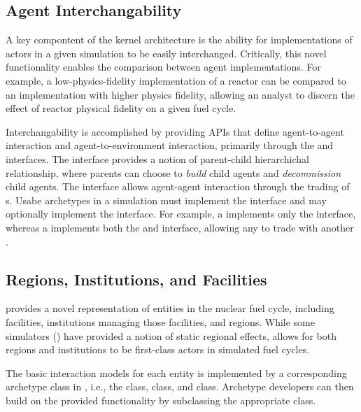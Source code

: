 \subsection{Agent Interchangability}\label{sec:interchangeability}

A key compontent of the \Cyclus kernel architecture is the ability for
implementations of actors in a given simulation to be easily
interchanged. Critically, this novel functionality enables the comparison
between agent implementations. For example, a low-physics-fidelity
implementation of a reactor can be compared to an implementation with higher
physics fidelity, allowing an analyst to discern the effect of reactor physical
fidelity on a given fuel cycle. 

Interchangability is accomplished by providing APIs that define agent-to-agent
interaction and agent-to-environment interaction, primarily through the
 and  interfaces. The  interface
provides a notion of parent-child hierarchichal relationship, where parents can
choose to \textit{build} child agents and \textit{decommission} child
agents. The  interface allows agent-agent interaction through the
trading of s. Usabe archetypes in a \Cyclus simulation must
implement the  interface and may optionally implement the
 interface. For example, a  implements only the
 interface, whereas a  implements both the
 and  interface, allowing any  to
trade with another .

\subsection{Regions, Institutions, and Facilities}

\Cyclus provides a novel representation of entities in the nuclear fuel cycle,
including facilities, institutions managing those facilities, and regions. While
some simulators () have provided a notion of static regional
effects, \Cyclus allows for both regions and institutions to be first-class
actors in simulated fuel cycles.

The basic interaction models for each entity is implemented by a corresponding
archetype class in \Cyclus, i.e., the  class, 
class, and  class. Archetype developers can then build on the
provided functionality by subclassing the appropriate class.

